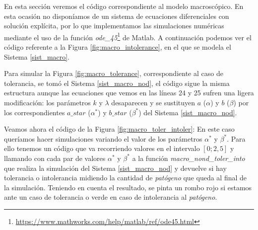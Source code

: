 En esta sección veremos el código correspondiente al modelo macroscópico. En esta ocasión no disponíamos de un sistema de ecuaciones diferenciales con solución explícita, por lo que implementamos las simulaciones numéricas mediante el uso de la función \textit{ode\_45}\footnote{\url{https://www.mathworks.com/help/matlab/ref/ode45.html}} de Matlab. A continuación podemos ver el código referente a la Figura \ref{fig:macro_intolerance}, en el que se modela el Sistema \ref{sist_macro}. 

Para simular la Figura \ref{fig:macro_tolerance}, correspondiente al caso de tolerancia, se tomó el Sistema \ref{sist_macro_nod}, el código sigue la misma estructura aunque las ecuaciones que vemos en las líneas 24 y 25 sufren una ligera modificación: los parámetros $k$ y $\lambda$ desaparecen y se sustituyen $a$ ($\alpha$) y $b$ ($\beta$) por los correspondientes $a\_star$ ($\alpha ^{*}$) y $b\_star$ ($\beta ^{*}$) del Sistema \ref{sist_macro_nod}. 




Veamos ahora el código de la Figura \ref{fig:macro_toler_intoler}: En este caso queríamos hacer simulaciones variando el valor de los parámetros $\alpha ^{*}$ y $\beta ^{*}$. Para ello tenemos un código que va recorriendo valores en el intervalo $[0; 2,5]$ y llamando con cada par de valores $\alpha ^{*}$ y $\beta ^{*}$ a la función \textit{macro\_nond\_toler\_into} que realiza la simulación del Sistema \ref{sist_macro_nod} y devuelve si hay tolerancia o intolerancia midiendo la cantidad de \textit{patógeno} que queda al final de la simulación. Teniendo en cuenta el resultado, se pinta un rombo rojo si estamos ante un caso de tolerancia o verde en caso de intolerancia al \textit{patógeno}.




